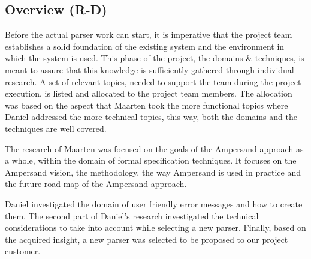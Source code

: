 
\subsection{Overview (R-D)}
\label{domain:overview}
Before the actual parser work can start, it is imperative that the project team establishes a solid foundation of the existing system and the environment in which the system is used.
This phase of the project, the domains \& techniques, is meant to assure that this knowledge is sufficiently gathered through individual research.
A set of relevant topics, needed to support the team during the project execution, is listed and allocated to the project team members.
The allocation was based on the aspect that Maarten took the more functional topics where Daniel addressed the more technical topics, this way, both the domains and the techniques are well covered.

The research of Maarten was focused on the goals of the Ampersand approach as a whole, within the domain of formal specification techniques.
It focuses on the Ampersand vision, the methodology, the way Ampersand is used in practice and the future road-map of the Ampersand approach.

Daniel investigated the domain of user friendly error messages and how to create them.
The second part of Daniel's research investigated the technical considerations to take into account while selecting a new parser.
Finally, based on the acquired insight, a new parser was selected to be proposed to our project customer.